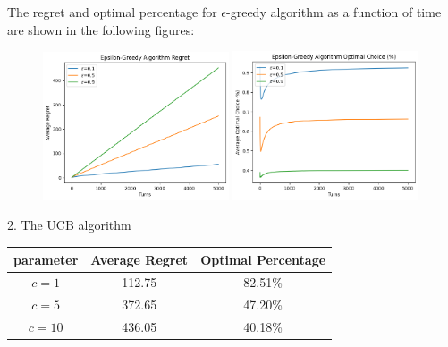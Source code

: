 \newpage
The regret and optimal percentage for $\epsilon$-greedy algorithm as a function of time are shown in the following figures:
\begin{figure}[h]
    \centering
    \includegraphics[width=0.49\textwidth]{./figure/epsilon_greedy_regret.png}
    \includegraphics[width=0.49\textwidth]{./figure/epsilon_greedy_optimal.png}
\end{figure}

2. The UCB algorithm
\begin{table}[h]
    \centering
    \begin{tabular}{c c c}
    \toprule
    parameter & Average Regret & Optimal Percentage \\
    \midrule
    $c=1$  & 112.75 & 82.51\% \\
    $c=5$  & 372.65 & 47.20\% \\
    $c=10$ & 436.05 & 40.18\% \\
    \bottomrule
\end{tabular}
\end{table}


